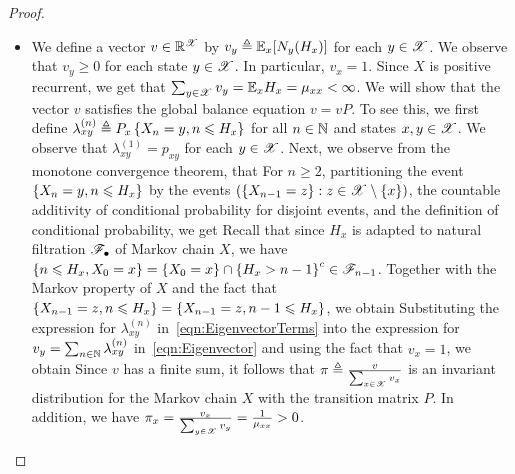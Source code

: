\documentclass[letterpaper,10pt,english]{article}
\begin{document}
\begin{proof}
\begin{itemize}
\begin{itemize}
\item[Existence:] 
We define a vector $v \in \mathbb{R}^{\mathscr{X}}$ by $v_y \triangleq \mathbb{E}_x[N_y(H_x)]$ for each $y \in \mathscr{X}$. 
We observe that $v_y \ge 0$ for each state $y \in \mathscr{X}$. 
In particular, $v_x = 1$. 
Since $X$ is positive recurrent, we get that $\sum_{y \in \mathscr{X}}v_y = \mathbb{E}_xH_x = \mu_{xx} < \infty$. 
We will show that the vector $v$ satisfies the global balance equation $v = vP$. 
To see this, we first define $\lambda_{xy}^{(n)}  \triangleq P_x\left\{X_n = y, n \leqslant H_x\right\}$ for all $n \in \mathbb{N}$ and states $x,y\in\mathscr{X}$. 
We observe that $\lambda_{xy}^{(1)} = p_{xy}$ for each $y \in \mathscr{X}$. 
Next, we observe from the monotone convergence theorem, that 
For $n \ge 2$, partitioning the event $\left\{X_n=y, n \leqslant H_x\right\}$ by the events $(\left\{X_{n-1}=z\right\}: z \in \mathscr{X}\setminus\left\{x\right\})$, the countable additivity of conditional probability for disjoint events, and the definition of conditional probability, we get 
Recall that since $H_x$ is adapted to natural filtration $\mathscr{F}_\bullet$ of Markov chain $X$, 
we have $\left\{n \leqslant H_x, X_0=x\right\} = \left\{X_0=x\right\}\cap\left\{H_x > n-1\right\}^c \in \mathscr{F}_{n-1}$. 
Together with the Markov property of $X$ and the fact that $\left\{X_{n-1}=z, n \leqslant H_x\right\} = \left\{X_{n-1}=z, n-1 \leqslant H_x\right\}$, we obtain 
Substituting the expression for $\lambda_{xy}^{(n)}$ in~\eqref{eqn:EigenvectorTerms} into the expression for  $v_y = \sum_{n \in \mathbb{N}}\lambda_{xy}^{(n)}$ in~\eqref{eqn:Eigenvector} and using the fact that $v_x = 1$, we obtain 
Since $v$ has a finite sum, it follows that $\pi \triangleq \frac{v}{\sum_{x \in \mathscr{X}}v_x}$ is an invariant distribution for the Markov chain $X$ with the transition matrix $P$. 
In addition, we have $\pi_x = \frac{v_x}{\sum_{y \in \mathscr{X}}v_y} = \frac{1}{\mu_{xx}} > 0$. 


\end{itemize}
\end{itemize}
\end{proof}
\end{document}
